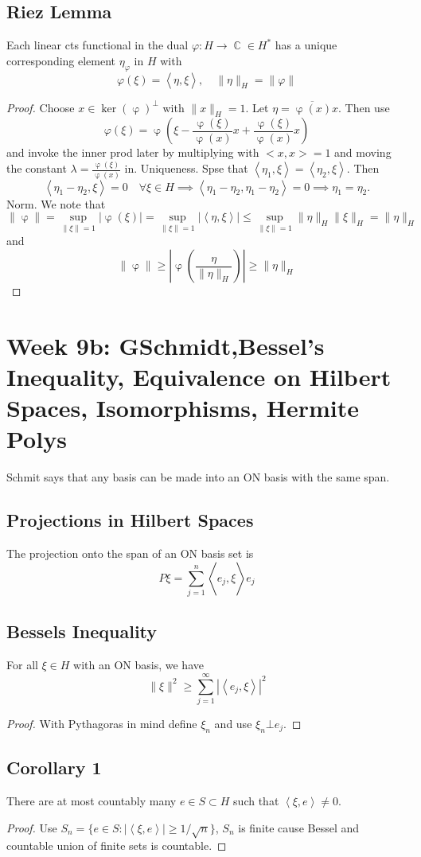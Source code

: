 \documentclass{article}
\DeclareMathOperator\vphi{\varphi}
\DeclareMathOperator\C{\mathbb{C}}
\DeclareMathOperator\la{\langle}
\DeclareMathOperator\ra{\rangle}
\begin{document}
\subsection*{Riez Lemma}
Each linear cts functional in the dual $\varphi: H \to \C \in H^*$
has a unique corresponding element $\eta_\varphi$ in $H$ with $$
\varphi(\xi) =  \la \eta, \xi \ra, \quad \|\eta\|_H = \|\varphi\|
$$
\begin{proof}
Choose $x \in \ker(\vphi)^\bot$ with $\|x\|_H = 1$.
Let $\eta = \overline{\vphi(x)}x$. Then use $$
\varphi(\xi) = \vphi \left( \xi - \frac{\vphi(\xi)}{\vphi(x)}x + \frac{\vphi(\xi)}{\vphi(x)}x  \right)
$$
and invoke the inner prod later by multiplying with $<x,x> = 1$
and moving the constant $\lambda = \frac{\vphi(\xi)}{\vphi(x)}$ in.
Uniqueness. Spse that $\la \eta_1,\xi \ra = \la \eta_2,\xi \ra$. Then $$
\la \eta_1 -\eta_2, \xi \ra = 0 \quad \forall \xi \in H \implies \la \eta_1 -\eta_2, \eta_1 -\eta_2 \ra = 0 \implies \eta_1 = \eta_2.
$$
Norm. We note that $$
\|\vphi\| = \sup_{\|\xi\| = 1} |\vphi(\xi)| = \sup_{\|\xi\| = 1} |\la \eta, \xi \ra| \leq \sup_{\|\xi\| = 1} \|\eta\|_H \|\xi\|_H = \|\eta\|_H
$$
and $$
\|\vphi\| \geq \left| \vphi \left(\frac{\eta}{\|\eta\|_H} \right) \right| \geq \|\eta\|_H
$$
\end{proof}
\section*{Week 9b: GSchmidt,Bessel's Inequality, Equivalence on Hilbert Spaces, Isomorphisms, Hermite Polys}
Schmit says that any basis can be made into an ON basis with the same span.
\subsection*{Projections in Hilbert Spaces}
The projection onto the span of an ON basis set is $$
P \xi = \sum_{j=1}^n \la e_j, \xi \ra e_j
$$
\subsection*{Bessels Inequality}
For all $\xi \in H$ with an ON basis, we have $$
\|\xi\|^2 \geq \sum_{j=1}^{\infty}|\la e_j, \xi \ra|^2
$$
\begin{proof}
With Pythagoras in mind define $\xi_n$ and use $\xi_n \bot e_j$.
\end{proof}
\subsection*{Corollary 1}
There are at most countably many $e \in S \subset H$ such that $\la \xi,e \ra \neq 0$.
\begin{proof}
Use $S_n = \{ e \in S: |\la \xi, e \ra| \geq 1 \slash \sqrt{n}\}$, $S_n$ is finite cause Bessel and countable union of finite sets is countable.
\end{proof}
\end{document}
